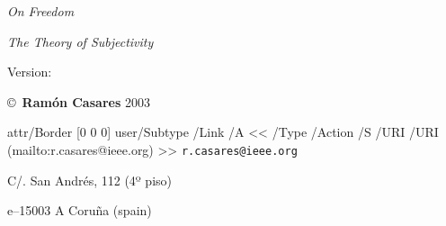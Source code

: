  \def\smallcaps#1{{\sc\lowercase{#1}}}

 {\sl On Freedom}\par
 {\sl The Theory of Subjectivity}\par
 Version: \todayiso \par
 \copyright\ {\bf Ram\'on Casares} 2003\par
 \indent\pdfcode \pdfstartlink attr{/Border [0 0 0]}
   user{/Subtype /Link /A << /Type /Action
    /S /URI /URI (mailto:r.casares@ieee.org) >>}\pdfendcode
  {\tt r.casares@ieee.org}\pdfcode \pdfendlink \pdfendcode\par
 C/. San Andrés, 112 (4º piso)\par
 \smallcaps E--15003 A Coru\~na (\smallcaps{SPAIN})\par

\break %


\null
\vfil
\rightline{[Dedication]}
\vfil
\rightline{[Acknowledgments]}
\vfil
\break %


\endinput
